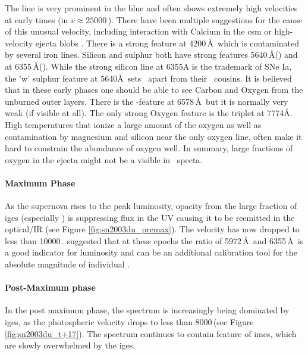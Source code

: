 The  line is very prominent in the blue and often shows extremely high velocities at early times (in  $v \approx 25000$\,\kms). There have been multiple suggestions for the cause of this unusual velocity, including interaction with Calcium in the \gls{csm} or high-velocity ejecta blobs \citep{1999ApJ...525..881H,2004ApJ...607..391G,2004ApJ...601.1019T,2005ApJ...623L..37M,2006ApJ...636..400Q,2006ApJ...645..470T,2007A&A...471..527G}. There is a strong  feature at 4200\,\AA\ which is contaminated by several iron lines. Silicon and sulphur both have strong features 5640\,\AA () and at 6355\,\AA (). While the strong silicon line at 6355A is the trademark of SNe Ia, the 'w' sulphur feature at 5640\AA\ sets \sneia\ apart from their \sneibc\ cousins. It is believed that in these early phases one should be able to see Carbon and Oxygen from the unburned outer layers. There is the -feature at 6578\,\AA\ but it is normally very weak (if visible at all). The only strong Oxygen feature is the  triplet at 7774\AA. High temperatures that ionize a large amount of the oxygen as well as contamination by magnesium and silicon near the only oxygen line, often make it hard to constrain the abundance of oxygen well. In summary, large fractions of oxygen in the ejecta might not be a visible in \sneia\ specta. 

\paragraph{Maximum Phase} As the supernova rises to the peak luminosity, opacity from the large fraction of \glspl{ige} (especially \Ni) is suppressing flux in the UV causing it to be reemitted in the optical/IR  (see Figure \ref{fig:sn2003du_premax}). The velocity has now dropped to less than 10000\,\kms. \citet{1995ApJ...455L.147N} suggested that at these epochs the ratio of  5972\,\AA\ and  6355\,\AA\ is a good indicator for luminosity and can be an additional calibration tool for the absolute magnitude of individual \sneia.


\paragraph{Post-Maximum phase}
In the post maximum phase, the spectrum is increasingly being dominated by \glspl{ige}, as the photospheric velocity drops to less than 8000\,\kms (see Figure \ref{fig:sn2003du_t+17}). The spectrum continues to contain feature of \glspl{ime}, which are slowly overwhelmed by the \glspl{ige}.


